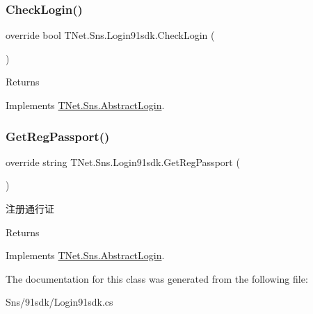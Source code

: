 \subsubsection{\texorpdfstring{Check\+Login()}{CheckLogin()}}
{\footnotesize\ttfamily override bool T\+Net.\+Sns.\+Login91sdk.\+Check\+Login (\begin{DoxyParamCaption}{ }\end{DoxyParamCaption})\hspace{0.3cm}{\ttfamily [virtual]}}





\begin{DoxyReturn}{Returns}

\end{DoxyReturn}


Implements \mbox{\hyperlink{class_t_net_1_1_sns_1_1_abstract_login_a6b5dac3d6d46efb7b1e4049e674105e5}{T\+Net.\+Sns.\+Abstract\+Login}}.

\mbox{\label{class_t_net_1_1_sns_1_1_login91sdk_a036829f25d9543f335e23a33bcf229b6}} 
\subsubsection{\texorpdfstring{Get\+Reg\+Passport()}{GetRegPassport()}}
{\footnotesize\ttfamily override string T\+Net.\+Sns.\+Login91sdk.\+Get\+Reg\+Passport (\begin{DoxyParamCaption}{ }\end{DoxyParamCaption})\hspace{0.3cm}{\ttfamily [virtual]}}



注册通行证 

\begin{DoxyReturn}{Returns}

\end{DoxyReturn}


Implements \mbox{\hyperlink{class_t_net_1_1_sns_1_1_abstract_login_a3930eb564bb4804e1b646d749f20907a}{T\+Net.\+Sns.\+Abstract\+Login}}.



The documentation for this class was generated from the following file\+:\begin{DoxyCompactItemize}
\item 
Sns/91sdk/Login91sdk.\+cs\end{DoxyCompactItemize}
